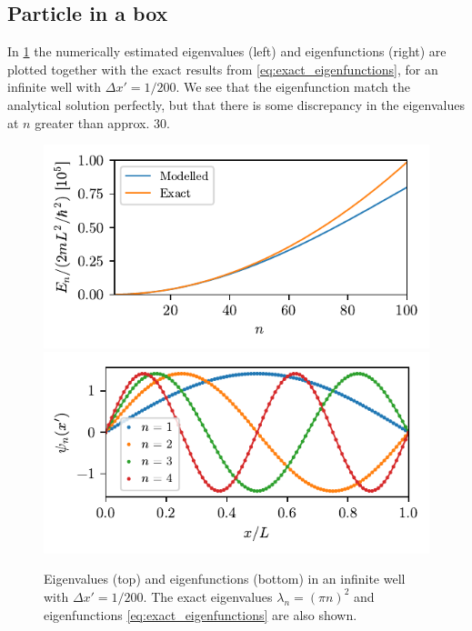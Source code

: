 \subsection*{Particle in a box}

In \cref{fig:box_solutions} the numerically estimated eigenvalues (left) and eigenfunctions (right) are plotted together with the exact results from \cref{eq:exact_eigenfunctions}, for an infinite well with $\Delta x' = 1/200$. We see that the eigenfunction match the analytical solution perfectly, but that there is some discrepancy in the eigenvalues at $n$ greater than approx. 30.

\begin{figure}[ht!]%
\centering%
\includegraphics{figs/box_eigenvalues.pdf}\\%
\includegraphics{figs/box_eigenvectors.pdf}%
\caption{Eigenvalues (top) and eigenfunctions (bottom) in an infinite well with $\Delta x' = 1/200$. The exact eigenvalues $\lambda_n = (\pi n)^2$ and eigenfunctions \cref{eq:exact_eigenfunctions} are also shown. \label{fig:box_solutions}}%
\end{figure}

